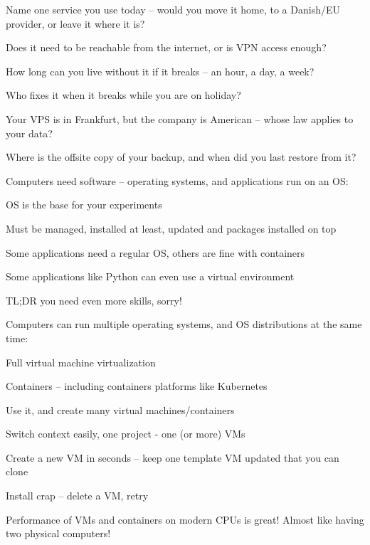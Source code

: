 \documentclass[Screen16to9,17pt]{foils}
\begin{document}

\begin{list2}
\item Name one service you use today -- would you move it home, to a Danish/EU provider, or leave it where it is?
\item Does it need to be reachable from the internet, or is VPN access enough?
\item How long can you live without it if it breaks -- an hour, a day, a week?
\item Who fixes it when it breaks while you are on holiday?
\item Your VPS is in Frankfurt, but the company is American -- whose law applies to your data?
\item Where is the offsite copy of your backup, and when did you last restore from it?
\end{list2}

\breakdance



Computers need software -- operating systems, and applications run on an OS:
\begin{list2}
\item OS is the base for your experiments
\item Must be managed, installed at least, updated and packages installed on top
\item Some applications need a regular OS, others are fine with containers
\item Some applications like Python can even use a virtual environment
\end{list2}

TL;DR you need even more skills, sorry!



Computers can run multiple operating systems, and OS distributions at the same time:
\begin{list2}
\item Full virtual machine virtualization
\item Containers -- including containers platforms like Kubernetes
\item Use it, and create many virtual machines/containers
\item Switch context easily, one project - one (or more) VMs
\item Create a new VM in seconds -- keep one template VM updated that you can clone
\item Install crap -- delete a VM, retry
\item Performance of VMs and containers on modern CPUs is great! Almost like having two physical computers!
\end{list2}
\end{document}
